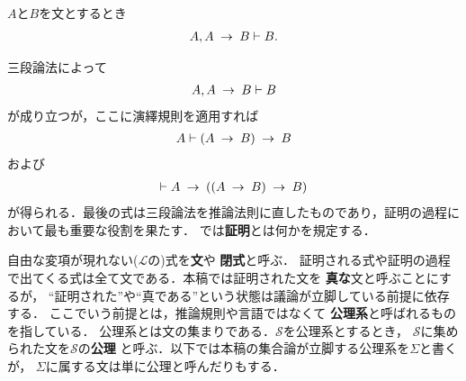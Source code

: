 	\begin{screen}
		\begin{logicalaxm}[三段論法]
			$A$と$B$を文とするとき
			\begin{align}
				A,A \hspace{0.25em}\rightarrow\hspace{0.25em} B \vdash B.
			\end{align}
		\end{logicalaxm}
	\end{screen}
	
	三段論法によって
	\begin{align}
		A,A \hspace{0.25em}\rightarrow\hspace{0.25em} B \vdash B
	\end{align}
	が成り立つが，ここに演繹規則を適用すれば
	\begin{align}
		A \vdash (A \hspace{0.25em}\rightarrow\hspace{0.25em} B) \hspace{0.25em}\rightarrow\hspace{0.25em} B
	\end{align}
	および
	\begin{align}
		\vdash A \hspace{0.25em}\rightarrow\hspace{0.25em} ((A \hspace{0.25em}\rightarrow\hspace{0.25em} B) \hspace{0.25em}\rightarrow\hspace{0.25em} B)
	\end{align}
	が得られる．最後の式は三段論法を推論法則に直したものであり，証明の過程において最も重要な役割を果たす．
	では{\bf 証明}とは何かを規定する．
	
	自由な変項が現れない($\mathcal{L}$の)式を{\bf 文}や
	{\bf 閉式}と呼ぶ．
	証明される式や証明の過程で出てくる式は全て文である．本稿では証明された文を
	{\bf 真な}文と呼ぶことにするが，
	``証明された''や``真である''という状態は議論が立脚している前提に依存する．
	ここでいう前提とは，推論規則や言語ではなくて
	{\bf 公理系}と呼ばれるものを指している．
	公理系とは文の集まりである．$\mathscr{S}$を公理系とするとき，
	$\mathscr{S}$に集められた文を$\mathscr{S}$の{\bf 公理}
	と呼ぶ．以下では本稿の集合論が立脚する公理系を$\Sigma$と書くが，
	$\Sigma$に属する文は単に公理と呼んだりもする．
	
